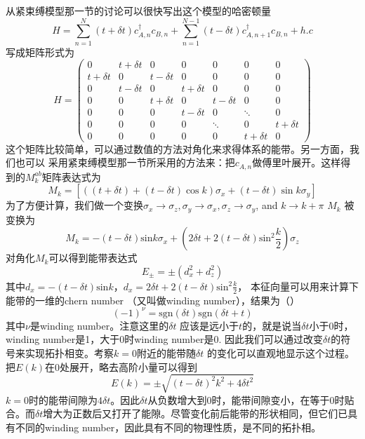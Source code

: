 从紧束缚模型那一节的讨论可以很快写出这个模型的哈密顿量
\begin{equation}
H=\sum_{n=1}^{N}(t+\delta t) c_{A, n}^{\dagger} c_{B, n}+\sum_{n=1}^{N-1}(t-\delta t) c_{A, n+1}^{\dagger} c_{B, n}+h . c
\end{equation}
写成矩阵形式为
\begin{equation}
H=\left(\begin{array}{ccccccc}0 & t+\delta t & 0 & 0 & 0 & 0 & 0 \\ t+\delta t & 0 & t-\delta t & 0 & 0 & 0 & 0 \\ 0 & t-\delta t & 0 & t+\delta t & 0 & 0 & 0 \\ 0 & 0 & t+\delta t & 0 & t-\delta t & 0 & 0 \\ 0 & 0 & 0 & t-\delta t & 0 & \ddots & 0 \\ 0 & 0 & 0 & 0 & \ddots & 0 & t+\delta t \\ 0 & 0 & 0 & 0 & 0 & t+\delta t & 0\end{array}\right)
\end{equation}
这个矩阵比较简单，可以通过数值的方法对角化来求得体系的能带。另一方面，我们也可以
采用紧束缚模型那一节所采用的方法来：把$c_{A, n}$做傅里叶展开。这样得到的$M^{ab}_k$矩阵表达式为
\begin{equation}
  M_k = \left[((t+\delta t)+(t-\delta t) \cos k) \sigma_{x}+(t-\delta t) \sin k \sigma_{y}\right] 
\end{equation}
为了方便计算，我们做一个变换$\sigma_x \rightarrow \sigma_z, \sigma_y
\rightarrow \sigma_x, \sigma_z \rightarrow \sigma_y$, and $k \rightarrow k + \pi$ $M_k$ 被变换为
\begin{equation}
  M_k = -(t - \delta t) \text{sin}k \sigma_x + (2 \delta t + 2 (t - \delta t) \text{sin}^2\frac{k}{2}) \sigma_z
\end{equation}
对角化$M_k$可以得到能带表达式
\begin{equation}
  E_{\pm} = \pm (d_x^2 + d_z^2)
\end{equation}
其中$d_x = -(t - \delta t) \text{sin}k$，$d_x = 2 \delta t + 2 (t - \delta t) \text{sin}^2\frac{k}{2}$， 本征向量可以用来计算下能带的一维的chern number （又叫做winding number），结果为（\cite{topoText}）
\begin{equation}
  (-1)^\nu = \text{sgn}(\delta t) \text{sgn}(\delta t + t)
\end{equation}
其中$\nu$是winding number。注意这里的$\delta t$ 应该是远小于$t$的，就是说当$\delta t$小于0时，winding number是1，大于0时winding number是0. 因此我们可以通过改变$\delta t$的符号来实现拓扑相变。考察$k=0$附近的能带随$\delta t$ 的变化可以直观地显示这个过程。把$E(k)$在0处展开，略去高阶小量可以得到
\begin{equation}
  E(k) = \pm \sqrt{(t - \delta t)^2 k^2 + 4 \delta t^2}
\end{equation}
$k = 0$时的能带间隙为$4\delta t$。因此$\delta t$从负数增大到0时，能带间隙变小，在等于0时贴合。而$\delta t$增大为正数后又打开了能隙。尽管变化前后能带的形状相同，但它们已具有不同的winding number，因此具有不同的物理性质，是不同的拓扑相。

